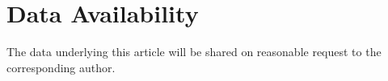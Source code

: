 \documentclass[fleqn,usenatbib]{mnras}
\begin{document}
\section*{Data Availability}
The data underlying this article will be shared on reasonable request to the corresponding author.



 








\bsp	%
\label{lastpage}
\end{document}
